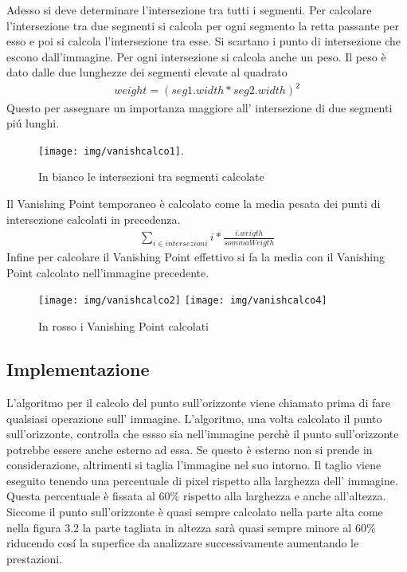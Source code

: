 		Adesso si deve determinare l'intersezione tra tutti i segmenti. Per calcolare l'intersezione tra due segmenti si calcola per ogni segmento la retta passante per esso e poi si calcola l'intersezione tra esse. Si scartano i punto di intersezione che escono dall'immagine. Per ogni intersezione si calcola anche un peso. Il peso è dato dalle due lunghezze dei segmenti elevate al quadrato
		\begin{align*}
			weight = (seg1.width * seg2.width)^{2}
		\end{align*}
		Questo per assegnare un importanza maggiore all' intersezione di due segmenti pi\'u lunghi.
		\begin{figure}[!ht]
			\centering
			\texttt{[image: img/vanishcalco1]}.
			\caption[Intersezioni dei segmenti]{In bianco le intersezioni tra segmenti calcolate}
		\end{figure}
		Il Vanishing Point temporaneo è calcolato come la media pesata dei punti di intersezione calcolati in precedenza.
		\begin{align*}
			\sum\limits_{i \in intersezioni} i * \frac{i.weigth}{sommaWeigth}
		\end{align*}
		Infine per calcolare il Vanishing Point effettivo si fa la media con il Vanishing Point calcolato nell'immagine precedente.

		\begin{figure}[!ht]
			\centering
			\texttt{[image: img/vanishcalco2]}
			\hspace{7mm}
			\texttt{[image: img/vanishcalco4]}
			\caption[Vanishing Point calcolati]{In rosso i Vanishing Point calcolati}
		\end{figure}

	\subsection{Implementazione}
		L'algoritmo per il calcolo del punto sull'orizzonte viene chiamato prima di fare qualsiasi operazione sull' immagine. L'algoritmo, una volta calcolato il punto sull'orizzonte, controlla che essso sia nell'immagine perchè il punto sull'orizzonte potrebbe essere anche esterno ad essa. Se questo è esterno non si prende in considerazione, altrimenti si taglia l'immagine nel suo intorno. Il taglio viene eseguito tenendo una percentuale di pixel rispetto alla larghezza dell' immagine. Questa percentuale è fissata al 60\% rispetto alla larghezza e anche all'altezza. Siccome il punto sull'orizzonte è quasi sempre calcolato nella parte alta come nella figura 3.2 la parte tagliata in altezza sarà quasi sempre minore al 60\% riducendo cos\'i la superfice da analizzare successivamente aumentando le prestazioni. 

